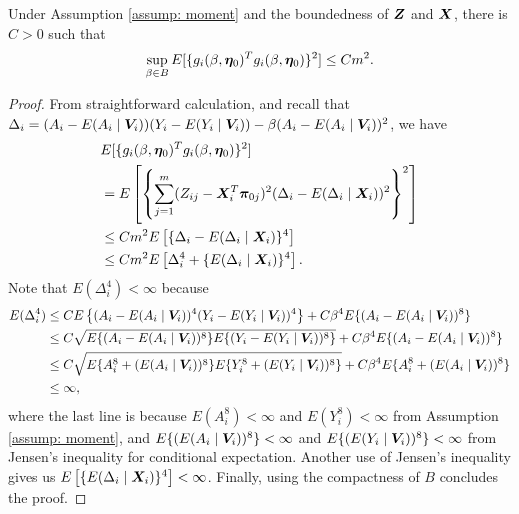 \documentclass[12pt]{article}
\begin{document}
{\begin{lemma} \label{lemma: sup g square}
	Under Assumption \ref{assump: moment} and the boundedness of $ \bm{Z} $ and $ \bm{X} $, there is $ C>0 $ such that 
	\[
	 	\sup_{\beta\in B} E[\{g_i(\beta, \bm \eta_0)^T g_i(\beta, \bm \eta_0)\}^2]\leq Cm^2 .
	\]
\end{lemma}
\begin{proof}
	From straightforward calculation, and recall that $ \Delta_i = (A_i -E(A_i\mid \bm{V}_i)) (Y_i -E(Y_i\mid \bm{V}_i) ) - \beta (A_i -E(A_i\mid \bm{V}_i))^2  $, 	we have  
	\begin{align*}
		&E[\{g_i(\beta, \bm \eta_0)^T g_i(\beta, \bm \eta_0)\}^2] \\
		&= E\left[ \left\{\sum_{j=1}^m (Z_{ij}- \bm{X}_i^T \bm\pi_{0j} )^2 ( \Delta_i - E(\Delta_i \mid \bm{X}_i))^2\right\}^2 \right] \\
		&\leq C m^2 E\left[  \{ \Delta_i - E(\Delta_i \mid \bm{X}_i)\}^4 \right] \\
		&\leq C m^2 E\left[   \Delta_i^4  + \{E(\Delta_i \mid \bm{X}_i)\}^4 \right]. 
	\end{align*}
Note that $ E( \Delta_i^4)<\infty  $ because 
\begin{align*}
E( \Delta_i^4) &\leq CE\left\{  (A_i -E(A_i\mid \bm{V}_i))^4  (Y_i -E(Y_i\mid \bm{V}_i) )^4  \right\} + C \beta^4 E\{(A_i -E(A_i\mid \bm{V}_i))^8\}\\
&\leq C \sqrt{ E\{(A_i -E(A_i\mid \bm{V}_i))^8 \}  E\{ (Y_i -E(Y_i\mid \bm{V}_i) )^8\} }  + C \beta^4 E\{(A_i -E(A_i\mid \bm{V}_i))^8\} \\
&\leq C \sqrt{ E\{ A_i^8 + (E(A_i\mid \bm{V}_i))^8 \} E\{ Y_i^8 + (E(Y_i\mid \bm{V}_i))^8 \} }  + C \beta^4 E\{ A_i^8 + (E(A_i\mid \bm{V}_i))^8 \}\\
&\leq \infty, 
\end{align*}
where the last line is because  $ E (A_i^8)<\infty $ and $ E (Y_i^8)<\infty $ from Assumption \ref{assump: moment}, and $ E \{ (E(A_i\mid \bm{V}_i))^8 \}<\infty $ and $ E \{  (E(Y_i\mid \bm{V}_i))^8 \}<\infty$ from Jensen's inequality for conditional expectation. Another use of Jensen's inequality gives us $ E\left[  \{E(\Delta_i \mid \bm{X}_i)\}^4 \right]<\infty  $.  Finally, using the  compactness of $ B $ concludes the proof.  
\end{proof}


}
\end{document}
